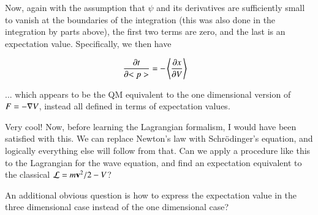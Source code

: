 \documentclass{article}
\begin{document}
Now, again with the assumption that $\psi$ and its derivatives are sufficiently small to vanish at the boundaries of the integration (this was also done in the integration by parts above), the first two terms are zero, and the last is an expectation value.  Specifically, we then have

\begin{align}
\frac{\partial{t}}{\partial {<p>}} &= - \left<\frac{\partial{x}}{\partial {V}}\right>
\end{align}

... which appears to be the QM equivalent to the one dimensional version of $F = -\nabla V$, instead all defined in terms of expectation values.

Very cool!  Now, before learning the Lagrangian formalism, I would have been satisfied with this.  We can replace Newton's law with 
Schr\"{o}dinger's equation, and logically everything else will follow from that.  Can we apply a procedure like this to 
the Lagrangian for the wave equation, and find an expectation equivalent to the classical $\mathcal{L} = m\mathbf{v}^2/2 - V$?

An additional obvious question is how to express the expectation value in the three dimensional case instead of the one dimensional case?



\end{document}
